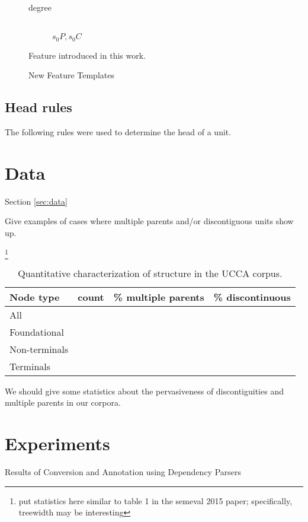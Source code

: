 \documentclass[11pt]{article}
\newcommand{\oa}[1]{\footnote{\color{red} #1}}
\newcommand{\secref}[1]{Section \ref{#1}}
\begin{document}
\begin{figure}[t]
\begin{description}
	\item[degree] \hfill \\
	$s_0P, s_0C$
\end{description}
\caption{New Feature Templates}
\medskip
\small
Feature introduced in this work.
\label{fig:new_features}
\end{figure}

\subsection{Head rules}
\label{subsec:head_rules}

The following rules were used to determine the head of a unit.

\section{Data}\secref{sec:data}

Give examples of cases where multiple parents and/or discontiguous units show up.

\oa{put statistics here similar to table 1 in the semeval 2015 paper; specifically, treewidth may be interesting}

\begin{table}[ht]
\begin{tabular}{lccc}
Node type & count & \% multiple parents & \% discontinuous \\
\hline
All &  & \\
Foundational &  & \\
Non-terminals &  & \\
Terminals &  &
\end{tabular}
\caption{Quantitative characterization of structure in the UCCA corpus. 
}
\end{table}

We should give some statistics about the pervasiveness of discontiguities and multiple parents in our corpora.

\section{Experiments}

\begin{table*}
\caption{Results of Conversion and Annotation using Dependency Parsers}
\label{table:convert}
\end{table*}
\end{document}
